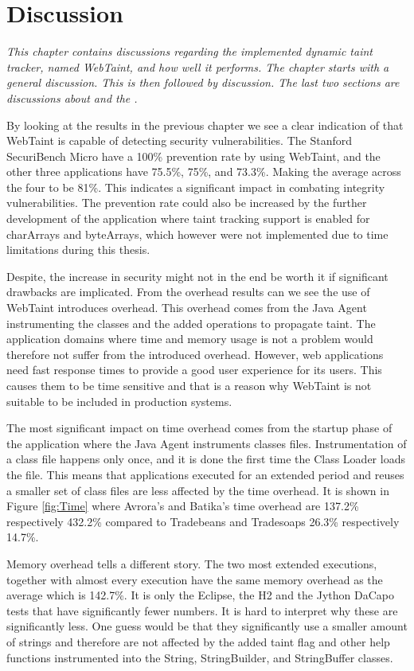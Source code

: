 \chapter{Discussion}
\label{Discussion}
\textit{This chapter contains discussions regarding the implemented dynamic taint tracker, named WebTaint, and how well it performs. The chapter starts with a general discussion. This is then followed by \textit{} discussion. The last two sections are discussions about \textit{} and the \textit{}.}

By looking at the results in the previous chapter we see a clear indication of that WebTaint is capable of detecting security vulnerabilities. The Stanford SecuriBench Micro have a 100\% prevention rate by using WebTaint, and the other three applications have 75.5\%, 75\%, and 73.3\%. Making the average across the four to be 81\%. This indicates a significant impact in combating integrity vulnerabilities. The prevention rate could also be increased by the further development of the application where taint tracking support is enabled for charArrays and byteArrays, which however were not implemented due to time limitations during this thesis.

Despite, the increase in security might not in the end be worth it if significant drawbacks are implicated. From the overhead results can we see the use of WebTaint introduces overhead. This overhead comes from the Java Agent instrumenting the classes and the added operations to propagate taint. The application domains where time and memory usage is not a problem would therefore not suffer from the introduced overhead. However, web applications need fast response times to provide a good user experience for its users. This causes them to be time sensitive and that is a reason why WebTaint is not suitable to be included in production systems.

The most significant impact on time overhead comes from the startup phase of the application where the Java Agent instruments classes files. Instrumentation of a class file happens only once, and it is done the first time the Class Loader loads the file. This means that applications executed for an extended period and reuses a smaller set of class files are less affected by the time overhead. It is shown in Figure \ref{fig:Time} where Avrora's and Batika's time overhead are 137.2\% respectively 432.2\% compared to Tradebeans and Tradesoaps 26.3\% respectively 14.7\%.

Memory overhead tells a different story. The two most extended executions, together with almost every execution have the same memory overhead as the average which is 142.7\%. It is only the Eclipse, the H2 and the Jython DaCapo tests that have significantly fewer numbers. It is hard to interpret why these are significantly less. One guess would be that they significantly use a smaller amount of strings and therefore are not affected by the added taint flag and other help functions instrumented into the String, StringBuilder, and StringBuffer classes.



